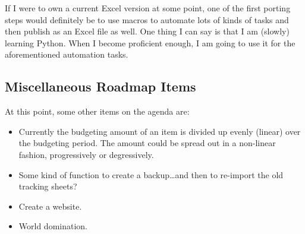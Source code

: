 If I were to own a current Excel version at some point, one of the first porting steps would definitely be to use macros to automate lots of kinds of tasks and then publish \tfn as an Excel file as well.
One thing I can say is that I am (slowly) learning Python.
When I become proficient enough, I am going to use it for the aforementioned automation tasks.

\subsection{Miscellaneous Roadmap Items}
\label{subsec:misc-roadmap-items}

At this point, some other items on the agenda are:
\begin{itemize}
	\item Currently the budgeting amount of an item is divided up evenly (\ie linear) over the budgeting period.
	The amount could be spread out in a non-linear fashion, \eg progressively or degressively.
	\item Some kind of function to create a backup\ldots and then to re-import the old tracking sheets?
	\item Create a website.
	\item World domination.
\end{itemize}

